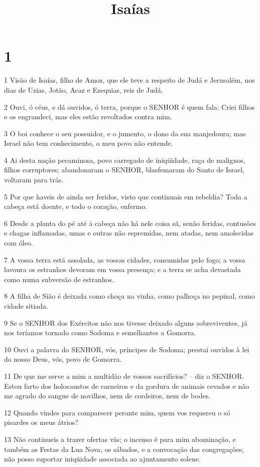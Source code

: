 

\title{Isaías}


\chapter{1}

\par 1 Visão de Isaías, filho de Amoz, que ele teve a respeito de Judá e Jerusalém, nos dias de Uzias, Jotão, Acaz e Ezequias, reis de Judá.
\par 2 Ouvi, ó céus, e dá ouvidos, ó terra, porque o SENHOR é quem fala: Criei filhos e os engrandeci, mas eles estão revoltados contra mim.
\par 3 O boi conhece o seu possuidor, e o jumento, o dono da sua manjedoura; mas Israel não tem conhecimento, o meu povo não entende.
\par 4 Ai desta nação pecaminosa, povo carregado de iniqüidade, raça de malignos, filhos corruptores; abandonaram o SENHOR, blasfemaram do Santo de Israel, voltaram para trás.
\par 5 Por que haveis de ainda ser feridos, visto que continuais em rebeldia? Toda a cabeça está doente, e todo o coração, enfermo.
\par 6 Desde a planta do pé até à cabeça não há nele coisa sã, senão feridas, contusões e chagas inflamadas, umas e outras não espremidas, nem atadas, nem amolecidas com óleo.
\par 7 A vossa terra está assolada, as vossas cidades, consumidas pelo fogo; a vossa lavoura os estranhos devoram em vossa presença; e a terra se acha devastada como numa subversão de estranhos.
\par 8 A filha de Sião é deixada como choça na vinha, como palhoça no pepinal, como cidade sitiada.
\par 9 Se o SENHOR dos Exércitos não nos tivesse deixado alguns sobreviventes, já nos teríamos tornado como Sodoma e semelhantes a Gomorra.
\par 10 Ouvi a palavra do SENHOR, vós, príncipes de Sodoma; prestai ouvidos à lei do nosso Deus, vós, povo de Gomorra.
\par 11 De que me serve a mim a multidão de vossos sacrifícios? -- diz o SENHOR. Estou farto dos holocaustos de carneiros e da gordura de animais cevados e não me agrado do sangue de novilhos, nem de cordeiros, nem de bodes.
\par 12 Quando vindes para comparecer perante mim, quem vos requereu o só pisardes os meus átrios?
\par 13 Não continueis a trazer ofertas vãs; o incenso é para mim abominação, e também as Festas da Lua Nova, os sábados, e a convocação das congregações; não posso suportar iniqüidade associada ao ajuntamento solene.
